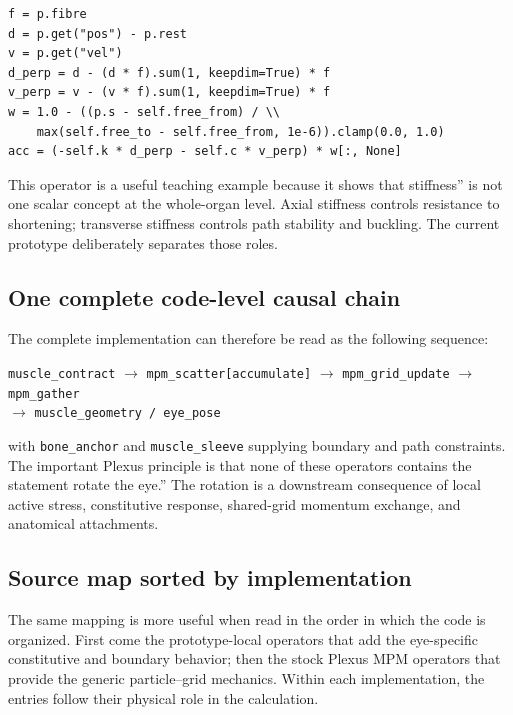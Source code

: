 \documentclass[11pt]{article}
\begin{document}
\begin{lstlisting}[caption={\texttt{prototype/eye/muscle\_ops.py}: transverse sleeve constraint; axial shortening is left unpenalised.},label={lst:sleeve-code}]
f = p.fibre
d = p.get("pos") - p.rest
v = p.get("vel")
d_perp = d - (d * f).sum(1, keepdim=True) * f
v_perp = v - (v * f).sum(1, keepdim=True) * f
w = 1.0 - ((p.s - self.free_from) / \\
    max(self.free_to - self.free_from, 1e-6)).clamp(0.0, 1.0)
acc = (-self.k * d_perp - self.c * v_perp) * w[:, None]
\end{lstlisting}

This operator is a useful teaching example because it shows that stiffness'' is not one scalar concept at the whole-organ level. Axial stiffness controls resistance to shortening; transverse stiffness controls path stability and buckling. The current prototype deliberately separates those roles.

\subsection{One complete code-level causal chain}

The complete implementation can therefore be read as the following sequence:

\begin{tcolorbox}[colback=codebg,colframe=codeframe]
\centering\scriptsize
\texttt{muscle\_contract}
$\rightarrow$
\texttt{mpm\_scatter[accumulate]}
$\rightarrow$
\texttt{mpm\_grid\_update}
$\rightarrow$
\texttt{mpm\_gather}
\\[3pt]
$\rightarrow$
\texttt{muscle\_geometry / eye\_pose}
\end{tcolorbox}
with \texttt{bone\_anchor} and \texttt{muscle\_sleeve} supplying boundary and path constraints. The important Plexus principle is that none of these operators contains the statement rotate the eye.'' The rotation is a downstream consequence of local active stress, constitutive response, shared-grid momentum exchange, and anatomical attachments.

\subsection{Source map sorted by implementation}

The same mapping is more useful when read in the order in which the code is organized. First come the prototype-local operators that add the eye-specific constitutive and boundary behavior; then the stock Plexus MPM operators that provide the generic particle--grid mechanics. Within each implementation, the entries follow their physical role in the calculation.
\end{document}
